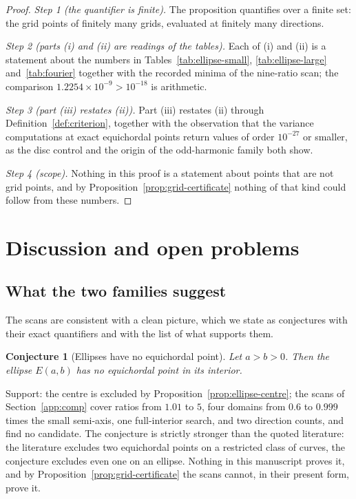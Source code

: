 \documentclass[11pt]{article}
\newtheorem{conjecture}[theorem]{Conjecture}
\theoremstyle{definition}
\theoremstyle{remark}
\begin{document}
{\begin{proof}
\emph{Step 1 (the quantifier is finite).} The proposition quantifies over a finite set: the grid points of finitely
many grids, evaluated at finitely many directions.

\emph{Step 2 (parts (i) and (ii) are readings of the tables).} Each of (i) and (ii) is a statement about the numbers
in Tables~\ref{tab:ellipse-small}, \ref{tab:ellipse-large} and~\ref{tab:fourier} together with the recorded minima
of the nine-ratio scan; the comparison $1.2254\times10^{-9}>10^{-18}$ is arithmetic.

\emph{Step 3 (part (iii) restates (ii)).} Part (iii) restates (ii) through Definition~\ref{def:criterion},
together with the observation that the variance computations at exact equichordal points return values of order
$10^{-27}$ or smaller, as the disc control and the origin of the odd-harmonic family both show.

\emph{Step 4 (scope).} Nothing in this proof is a statement about points that are not grid points, and by
Proposition~\ref{prop:grid-certificate} nothing of that kind could follow from these numbers.
\end{proof}

} %
\section{Discussion and open problems}\label{sec:discussion}

\subsection{What the two families suggest}

The scans are consistent with a clean picture, which we state as conjectures with their exact quantifiers and with
the list of what supports them.

\begin{conjecture}[Ellipses have no equichordal point]\label{conjecture-ellipse}
Let $a>b>0$. Then the ellipse $E(a,b)$ has no equichordal point in its interior.
\end{conjecture}

Support: the centre is excluded by Proposition~\ref{prop:ellipse-centre}; the scans of
Section~\ref{app:comp} cover ratios from $1.01$ to $5$, four domains from $0.6$ to $0.999$ times the small
semi-axis, one full-interior search, and two direction counts, and find no candidate. The conjecture is strictly
stronger than the quoted literature: the literature excludes two equichordal points on a restricted class of
curves, the conjecture excludes even one on an ellipse. Nothing in this manuscript proves it, and by
Proposition~\ref{prop:grid-certificate} the scans cannot, in their present form, prove it.
\end{document}
